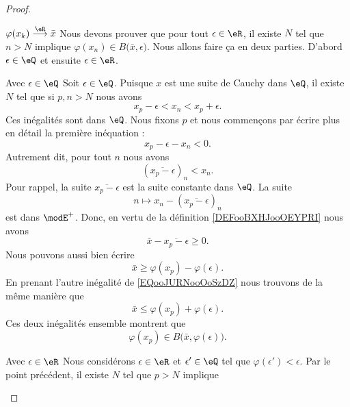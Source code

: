 \begin{proof}
\begin{subproof}
		\item[\( \varphi(x_k)\stackrel{\eR}{\longrightarrow}\bar x\)]
		Nous devons prouver que pour tout \( \epsilon\in \eR\), il existe \( N\) tel que \( n>N\) implique \( \varphi(x_n)\in B\big( \bar x,\epsilon \big)\). Nous allons faire ça en deux parties. D'abord \( \epsilon\in \eQ\) et ensuite \( \epsilon\in \eR\).
		\begin{subproof}
			\item[Avec \( \epsilon\in \eQ\)]
			Soit \( \epsilon\in \eQ\). Puisque \( x\) est une suite de Cauchy dans \( \eQ\), il existe \( N\) tel que si \( p,n>N\) nous avons
			\begin{equation}        \label{EQooJURNooOoSzDZ}
				x_p-\epsilon<x_n<x_p+\epsilon.
			\end{equation}
			Ces inégalités sont dans \( \eQ\). Nous fixons \( p\) et nous commençons par écrire plus en détail la première inéquation :
			\begin{equation}
				x_p-\epsilon-x_n<0.
			\end{equation}
			Autrement dit, pour tout \( n\) nous avons
			\begin{equation}
				(\overline{ x_p-\epsilon })_n<x_n.
			\end{equation}
			Pour rappel, la suite \(  \overline{ x_p-\epsilon } \) est la suite constante dans \( \eQ\). La suite
			\begin{equation}
				n\mapsto x_n-(\overline{ x_p-\epsilon })_n
			\end{equation}
			est dans \( \modE^+\). Donc, en vertu de la définition \ref{DEFooBXHJooOEYPRI} nous avons
			\begin{equation}
				\bar x-\overline{ x_p-\epsilon }\geq 0.
			\end{equation}
			Nous pouvons aussi bien écrire
			\begin{equation}
				\bar x\geq \varphi(x_p)-\varphi(\epsilon).
			\end{equation}
			En prenant l'autre inégalité de \eqref{EQooJURNooOoSzDZ} nous trouvons de la même manière que
			\begin{equation}
				\bar x\leq \varphi(x_p)+\varphi(\epsilon).
			\end{equation}
			Ces deux inégalités ensemble montrent que
			\begin{equation}
				\varphi(x_p)\in B\big( \bar x,\varphi(\epsilon) \big).
			\end{equation}
			\item[Avec \( \epsilon\in \eR\)]
			Nous considérons \( \epsilon\in \eR\) et \( \epsilon'\in \eQ\) tel que \( \varphi(\epsilon')<\epsilon\). Par le point précédent, il existe \( N\) tel que \( p>N\) implique

\end{subproof}
\end{subproof}
\end{proof}
